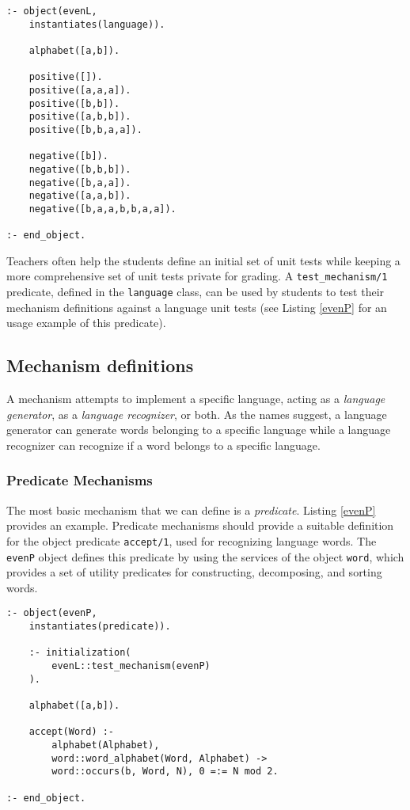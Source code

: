 \documentclass{llncs}
\begin{document}
\begin{lstlisting}[caption={Sequences of \textsl{a}s and \textsl{b}s with an even number of \textsl{b}s}, label=evenL]
:- object(evenL,
    instantiates(language)).

    alphabet([a,b]).

    positive([]).
    positive([a,a,a]).
    positive([b,b]).
    positive([a,b,b]).
    positive([b,b,a,a]).

    negative([b]).
    negative([b,b,b]).
    negative([b,a,a]).
    negative([a,a,b]).
    negative([b,a,a,b,b,a,a]).

:- end_object.
\end{lstlisting}

\noindent
Teachers often help the students define an initial set of unit tests while keeping a more comprehensive set of unit tests private for grading. A \lstinline{test_mechanism/1} predicate, defined in the \lstinline{language} class, can be used by students to test their mechanism definitions against a language unit tests (see Listing \ref{evenP} for an usage example of this predicate).

\subsection{Mechanism definitions}

A mechanism attempts to implement a specific language, acting as a \textsl{language generator}, as a \textsl{language recognizer}, or both. As the names suggest, a language generator can generate words belonging to a specific language while a language recognizer can recognize if a word belongs to a specific language.


\subsubsection{Predicate Mechanisms}

The most basic mechanism that we can define is a \textsl{predicate}. Listing \ref{evenP} provides an example. Predicate mechanisms should provide a suitable definition for the object predicate \lstinline{accept/1}, used for recognizing language words. The \lstinline{evenP} object defines this predicate by using the services of the object \lstinline{word}, which provides a set of utility predicates for constructing, decomposing, and sorting words.

\begin{lstlisting}[caption={Predicate mechanism for the \lstinline{evenL} language}, label=evenP]
:- object(evenP,
    instantiates(predicate)).

    :- initialization(
        evenL::test_mechanism(evenP)
    ).

    alphabet([a,b]).

    accept(Word) :-
        alphabet(Alphabet),
        word::word_alphabet(Word, Alphabet) ->
        word::occurs(b, Word, N), 0 =:= N mod 2.

:- end_object.
\end{lstlisting}
\end{document}
